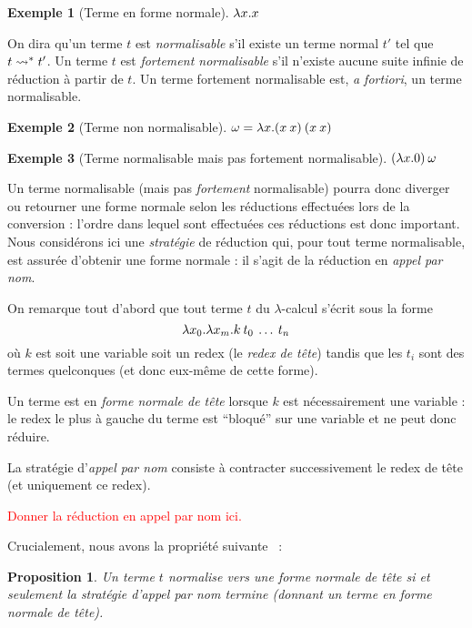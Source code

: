 \documentclass {article}
\newtheorem{proposition}{Proposition}
\theoremstyle{definition}
\newtheorem{example}{Exemple}
\theoremstyle{remark}
\newcommand{\todo}[1]{\textcolor{red}{#1}}
\begin{document}
\begin{example}[Terme en forme normale]
  \todo{\(\lambda x. x\)}
\end{example}

On dira qu'un terme \(t\) est \emph{normalisable} s'il existe un terme
normal \(t'\) tel que \(t \leadsto^{*} t'\). Un terme \(t\) est
\emph{fortement normalisable} s'il n'existe aucune suite infinie de
réduction à partir de \(t\). Un terme fortement normalisable est,
\textit{a fortiori}, un terme normalisable.

\begin{example}[Terme non normalisable]
  \todo{\(\omega = \lambda x. (x\:x)\:(x\:x)\)}
\end{example}

\begin{example}[Terme normalisable mais pas fortement normalisable]
  \todo{\((\lambda x. 0)\:\omega\)}
\end{example}

Un terme normalisable (mais pas \emph{fortement} normalisable) pourra
donc diverger ou retourner une forme normale selon les réductions
effectuées lors de la conversion : l'ordre dans lequel sont effectuées
ces réductions est donc important. Nous considérons ici une
\emph{stratégie} de réduction qui, pour tout terme normalisable, est assurée d'obtenir une forme
normale : il s'agit de la réduction en
\emph{appel par nom}.

On remarque tout d'abord que tout terme \(t\) du \(\lambda\)-calcul
s'écrit sous la forme
%
\[
\lambda x_0. \lambda x_m. k\:t_0\:\ldots\:t_n
\]
%
où \(k\) est soit une variable soit un redex (le \emph{redex de tête})
tandis que les \(t_i\) sont des termes quelconques (et donc eux-même
de cette forme).


Un terme est en \emph{forme normale de tête} lorsque \(k\) est
nécessairement une variable : le redex le plus à gauche du terme est
``bloqué'' sur une variable et ne peut donc réduire.

La stratégie d'\emph{appel par nom} consiste à contracter
successivement le redex de tête (et uniquement ce redex). 

\todo{Donner la réduction en appel par nom ici.}

Crucialement, nous avons la propriété suivante~\citep[th.3,
  p.62]{krivine:lambda-calculus} :
%
\begin{proposition}
  Un terme \(t\) normalise vers une forme normale de tête si et
  seulement la stratégie d'appel par nom termine (donnant un terme en
  forme normale de tête).
\end{proposition}
\end{document}
